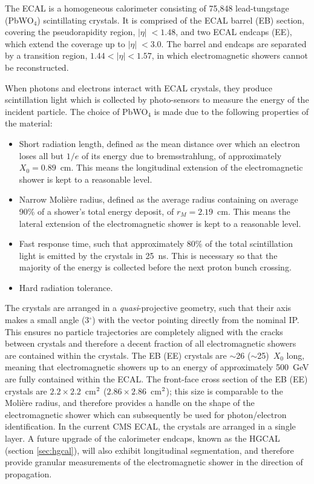 The ECAL is a homogeneous calorimeter consisting of 75,848 lead-tungstage (PbWO$_4$) scintillating crystals. It is comprised of the ECAL barrel (EB) section, covering the pseudorapidity region, $|\eta|\;<1.48$, and two ECAL endcaps (EE), which extend the coverage up to $|\eta|\;<3.0$. The barrel and endcaps are separated by a transition region, ${1.44<|\eta|<1.57}$, in which electromagnetic showers cannot be reconstructed. 

When photons and electrons interact with ECAL crystals, they produce scintillation light which is collected by photo-sensors to measure the energy of the incident particle. The choice of PbWO$_4$ is made due to the following properties of the material:
\begin{itemize}
    \item Short radiation length, defined as the mean distance over which an electron loses all but $1/e$ of its energy due to bremsstrahlung, of approximately $X_0=0.89$~cm. This means the longitudinal extension of the electromagnetic shower is kept to a reasonable level.
    \item Narrow Moli\`ere radius, defined as the average radius containing on average 90\% of a shower's total energy deposit, of $r_M=2.19$~cm. This means the lateral extension of the electromagnetic shower is kept to a reasonable level.
    \item Fast response time, such that approximately 80\% of the total scintillation light is emitted by the crystals in  25~ns. This is necessary so that the majority of the energy is collected before the next proton bunch crossing.
    \item Hard radiation tolerance.
\end{itemize}
The crystals are arranged in a \textit{quasi}-projective geometry, such that their axis makes a small angle (3$^\circ$) with the vector pointing directly from the nominal IP. This ensures no particle trajectories are completely aligned with the cracks between crystals and therefore a decent fraction of all electromagnetic showers are contained within the crystals. The EB (EE) crystals are $\sim$26 ($\sim$25)~$X_0$ long, meaning that electromagnetic showers up to an energy of approximately 500~GeV are fully contained within the ECAL. The front-face cross section of the EB (EE) crystals are $2.2\times2.2$~cm$^{\rm{2}}$ ($2.86\times2.86$~cm$^{\rm{2}}$); this size is comparable to the Moli\`ere radius, and therefore provides a handle on the shape of the electromagnetic shower which can subsequently be used for photon/electron identification. In the current CMS ECAL, the crystals are arranged in a single layer. A future upgrade of the calorimeter endcaps, known as the HGCAL (section \ref{sec:hgcal}), will also exhibit longitudinal segmentation, and therefore provide granular measurements of the electromagnetic shower in the direction of propagation.

